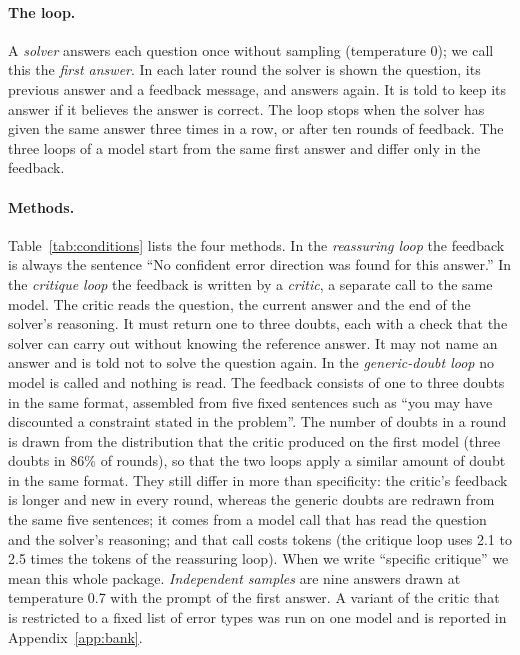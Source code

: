 \documentclass[11pt]{article}
\begin{document}
\paragraph{The loop.}
A \emph{solver} answers each question once without sampling (temperature 0); we call this the \emph{first answer}.
In each later round the solver is shown the question, its previous answer and a feedback message, and answers again.
It is told to keep its answer if it believes the answer is correct.
The loop stops when the solver has given the same answer three times in a row, or after ten rounds of feedback.
The three loops of a model start from the same first answer and differ only in the feedback.

\paragraph{Methods.}
Table~\ref{tab:conditions} lists the four methods.
In the \emph{reassuring loop} the feedback is always the sentence ``No confident error direction was found for this answer.''
In the \emph{critique loop} the feedback is written by a \emph{critic}, a separate call to the same model.
The critic reads the question, the current answer and the end of the solver's reasoning.
It must return one to three doubts, each with a check that the solver can carry out without knowing the reference answer.
It may not name an answer and is told not to solve the question again.
In the \emph{generic-doubt loop} no model is called and nothing is read.
The feedback consists of one to three doubts in the same format, assembled from five fixed sentences such as ``you may have discounted a constraint stated in the problem''.
The number of doubts in a round is drawn from the distribution that the critic produced on the first model (three doubts in 86\% of rounds), so that the two loops apply a similar amount of doubt in the same format.
They still differ in more than specificity: the critic's feedback is longer and new in every round, whereas the generic doubts are redrawn from the same five sentences; it comes from a model call that has read the question and the solver's reasoning; and that call costs tokens (the critique loop uses 2.1 to 2.5 times the tokens of the reassuring loop).
When we write ``specific critique'' we mean this whole package.
\emph{Independent samples} are nine answers drawn at temperature 0.7 with the prompt of the first answer.
A variant of the critic that is restricted to a fixed list of error types was run on one model and is reported in Appendix~\ref{app:bank}.
\end{document}
